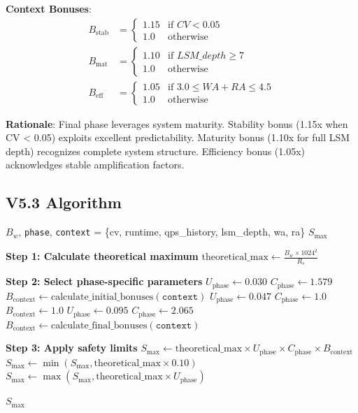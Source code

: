 \textbf{Context Bonuses}:
\begin{align}
B_{\text{stab}} &= \begin{cases}
1.15 & \text{if } CV < 0.05 \\
1.0  & \text{otherwise}
\end{cases} \\
B_{\text{mat}} &= \begin{cases}
1.10 & \text{if } LSM\_depth \geq 7 \\
1.0  & \text{otherwise}
\end{cases} \\
B_{\text{eff}} &= \begin{cases}
1.05 & \text{if } 3.0 \leq WA + RA \leq 4.5 \\
1.0  & \text{otherwise}
\end{cases}
\end{align}

\textbf{Rationale}: Final phase leverages system maturity. Stability bonus (1.15x when CV < 0.05) exploits excellent predictability. Maturity bonus (1.10x for full LSM depth) recognizes complete system structure. Efficiency bonus (1.05x) acknowledges stable amplification factors.

\subsection{V5.3 Algorithm}

\begin{algorithm}[H]
\caption{V5.3 Phase-Optimized Prediction Algorithm}
\begin{algorithmic}[1]
\REQUIRE $B_w$, \texttt{phase}, \texttt{context} = \{cv, runtime, qps\_history, lsm\_depth, wa, ra\}
\ENSURE $S_{\max}$

\STATE \textbf{Step 1: Calculate theoretical maximum}
\STATE $\text{theoretical\_max} \leftarrow \frac{B_w \times 1024^2}{R_s}$

\STATE \textbf{Step 2: Select phase-specific parameters}
    \STATE $U_{\text{phase}} \leftarrow 0.030$
    \STATE $C_{\text{phase}} \leftarrow 1.579$
    \STATE $B_{\text{context}} \leftarrow \text{calculate\_initial\_bonuses}(\texttt{context})$
    \STATE $U_{\text{phase}} \leftarrow 0.047$
    \STATE $C_{\text{phase}} \leftarrow 1.0$
    \STATE $B_{\text{context}} \leftarrow 1.0$
\ELSE
    \STATE $U_{\text{phase}} \leftarrow 0.095$
    \STATE $C_{\text{phase}} \leftarrow 2.065$
    \STATE $B_{\text{context}} \leftarrow \text{calculate\_final\_bonuses}(\texttt{context})$
\ENDIF

\STATE \textbf{Step 3: Apply safety limits}
\STATE $S_{\max} \leftarrow \text{theoretical\_max} \times U_{\text{phase}} \times C_{\text{phase}} \times B_{\text{context}}$
\STATE $S_{\max} \leftarrow \min(S_{\max}, \text{theoretical\_max} \times 0.10)$
\STATE $S_{\max} \leftarrow \max(S_{\max}, \text{theoretical\_max} \times U_{\text{phase}})$

\RETURN $S_{\max}$
\end{algorithmic}
\end{algorithm}

